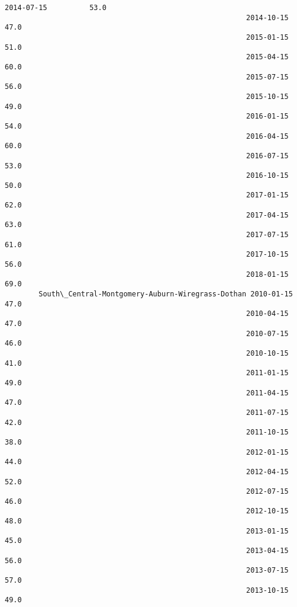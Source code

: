 \documentclass[11pt]{article}
\begin{document}
\begin{Verbatim}[commandchars=\\\{\}]
                                                         2014-07-15          53.0   
                                                         2014-10-15          47.0   
                                                         2015-01-15          51.0   
                                                         2015-04-15          60.0   
                                                         2015-07-15          56.0   
                                                         2015-10-15          49.0   
                                                         2016-01-15          54.0   
                                                         2016-04-15          60.0   
                                                         2016-07-15          53.0   
                                                         2016-10-15          50.0   
                                                         2017-01-15          62.0   
                                                         2017-04-15          63.0   
                                                         2017-07-15          61.0   
                                                         2017-10-15          56.0   
                                                         2018-01-15          69.0   
        South\_Central-Montgomery-Auburn-Wiregrass-Dothan 2010-01-15          47.0   
                                                         2010-04-15          47.0   
                                                         2010-07-15          46.0   
                                                         2010-10-15          41.0   
                                                         2011-01-15          49.0   
                                                         2011-04-15          47.0   
                                                         2011-07-15          42.0   
                                                         2011-10-15          38.0   
                                                         2012-01-15          44.0   
                                                         2012-04-15          52.0   
                                                         2012-07-15          46.0   
                                                         2012-10-15          48.0   
                                                         2013-01-15          45.0   
                                                         2013-04-15          56.0   
                                                         2013-07-15          57.0   
                                                         2013-10-15          49.0   

\end{Verbatim}
\end{document}
